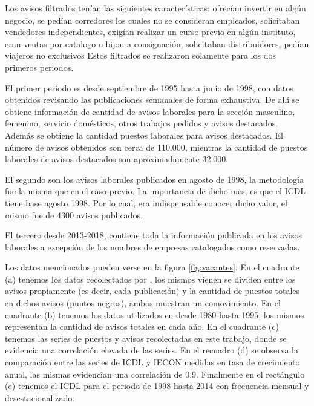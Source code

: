 Los avisos filtrados tenían las siguientes características: ofrecían invertir en algún negocio, se pedían corredores los cuales no se consideran empleados, solicitaban vendedores independientes, exigían realizar un curso previo en algún instituto, eran ventas por catalogo o bijou a consignación, solicitaban distribuidores, pedían viajeros no exclusivos Estos filtrados se realizaron solamente para los dos primeros periodos.

El primer periodo es desde septiembre de 1995 hasta junio de 1998, con datos obtenidos revisando las publicaciones semanales de forma exhaustiva. De allí se obtiene información de cantidad de avisos laborales para la sección masculino, femenino, servicio domésticos, otros trabajos pedidos y avisos destacados. Además se obtiene la cantidad puestos laborales para avisos destacados. El número de avisos obtenidos son cerca de 110.000, mientras la cantidad de puestos laborales de avisos destacados son aproximadamente 32.000. 

El segundo son los avisos laborales publicados en agosto de 1998, la metodología fue la misma que en el caso previo. La importancia de dicho mes, es que el ICDL tiene base agosto 1998. Por lo cual, era indispensable conocer dicho valor, el mismo fue de 4300 avisos publicados.

El tercero desde 2013-2018, contiene toda la información publicada en los avisos laborales a excepción de los nombres de empresas catalogados como reservadas.

Los datos mencionados pueden verse en la figura \ref{fig:vacantes}. En el cuadrante (a) tenemos los datos recolectados por \cite{Alma2011}, los mismos vienen se dividen entre los avisos propiamente (es decir, cada publicación) y la cantidad de puestos totales en dichos avisos (puntos negros), ambos muestran un comovimiento. En el cuadrante (b) tenemos los datos utilizados en \cite{Urrestarazu1997} desde 1980 hasta 1995, los mismos representan la cantidad de avisos totales en cada año. En el cuadrante (c) tenemos las series de puestos y avisos recolectadas en este trabajo, donde se evidencia una correlación elevada de las series. En el recuadro (d) se observa la comparación entre las series de ICDL y IECON medidas en tasa de crecimiento anual, las mismas evidencian una correlación de 0.9. Finalmente en el rectángulo (e) tenemos el ICDL para el periodo de 1998 hasta 2014 con frecuencia mensual y desestacionalizado.


